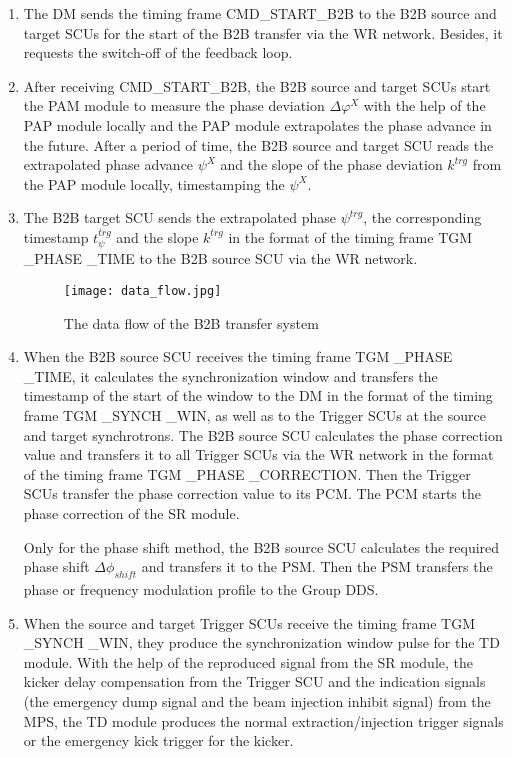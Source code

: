 \begin{enumerate}
\item The DM sends the timing frame CMD\_START\_B2B to the B2B source and target SCUs for the start of the B2B transfer via the WR network. Besides, it requests the switch-off of the feedback loop.

\item  After receiving CMD\_START\_B2B, the B2B source and target SCUs start the PAM module to measure the phase deviation $\Delta \varphi^X$ with the help of the PAP module locally and the PAP module extrapolates the phase advance in the future. After a period of time, the B2B source and target SCU reads the extrapolated phase advance $\psi^X$ and the slope of the phase deviation $k^\mathit{trg}$ from the PAP module locally, timestamping the $\psi^X$.  

\item  The B2B target SCU sends the extrapolated phase $\psi^\mathit{trg}$, the corresponding timestamp $t_\psi^\mathit{trg}$ and the slope $k^\mathit{trg}$ in the format of the timing frame TGM \_PHASE \_TIME to the B2B source SCU via the WR network. 
\begin{figure}[!htb]
   \centering   
   \texttt{[image: data\_flow.jpg]}
   \caption{The data flow of the B2B transfer system}
   \label{data_flow}
\end{figure}  

\item  When the B2B source SCU receives the timing frame TGM \_PHASE \_TIME, it calculates the synchronization window and transfers the timestamp of the start of the window to the DM in the format of the timing frame TGM \_SYNCH \_WIN, as well as to the Trigger SCUs at the source and target synchrotrons.
The B2B source SCU calculates the phase correction value and transfers it to all Trigger SCUs via the WR network in the format of the timing frame TGM \_PHASE \_CORRECTION. Then the Trigger SCUs transfer the phase correction value to its \gls{PCM}. The PCM starts the phase correction of the SR module. 

Only for the phase shift method, the B2B source SCU calculates the required phase shift $\Delta \phi_\mathit{shift}$ and transfers it to the PSM. Then the PSM transfers the phase or frequency modulation profile to the Group DDS.  

\item  When the source and target Trigger SCUs receive the timing frame TGM \_SYNCH \_WIN, they produce the synchronization window pulse for the TD module. With the help of the reproduced signal from the SR module, the kicker delay compensation from the Trigger SCU and the indication signals (the emergency dump signal and the beam injection inhibit signal) from the MPS, the TD module produces the normal extraction/injection trigger signals or the emergency kick trigger for the kicker.  


\end{enumerate}

